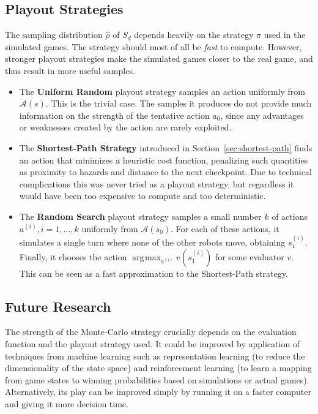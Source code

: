 \documentclass{article}
\newcommand{\action}{a}
\newcommand{\actions}{\mathcal{A}}
\newcommand{\randomState}{S}
\newcommand{\state}{s}
\newcommand{\depth}{d}
\newcommand{\evaluator}{v}
\newcommand{\probability}{\rho}
\DeclareMathOperator*{\argmax}{\arg\!\max}
\newcommand{\initial}{0}
\begin{document}
\subsection{Playout Strategies} \label{sec:playout-strategies}

The sampling distribution $\hat{\probability}$ of $\randomState_\depth$ depends heavily on the strategy $\pi$ used in the simulated games.  The strategy should most of all be \emph{fast} to compute.  However, stronger playout strategies make the simulated games closer to the real game, and thus result in more useful samples.

\begin{itemize}
\item The \textbf{Uniform Random} playout strategy samples an action uniformly from $\actions(\state)$.  This is the trivial case.  The samples it produces do not provide much information on the strength of the tentative action $\action_\initial$, since any advantages or weaknesses created by the action are rarely exploited.  \\
\item The \textbf{Shortest-Path Strategy} introduced in Section~\ref{sec:shortest-path} finds an action that minimizes a heuristic cost function, penalizing such quantities as proximity to hazards and distance to the next checkpoint.  Due to technical complications this was never tried as a playout strategy, but regardless it would have been too expensive to compute and too deterministic. \\
\item The \textbf{Random Search} playout strategy samples a small number $k$ of actions $\action^{(i)}, i = 1,\ldots,k$ uniformly from $\actions(\state_0)$.  For each of these actions, it simulates a single turn where none of the other robots move, obtaining $\state_1^{(i)}$.  Finally, it chooses the action $\argmax_{\action^{(i)}} \evaluator(\state_1^{(i)})$ for some evaluator $\evaluator$.  This can be seen as a fast approximation to the Shortest-Path strategy. \\
\end{itemize}


\subsection{Future Research}

The strength of the Monte-Carlo strategy crucially depends on the evaluation function and the playout strategy used.  It could be improved by application of techniques from machine learning such as representation learning \cite{bengio2013representation} (to reduce the dimensionality of the state space) and reinforcement learning \cite{sutton1998reinforcement} (to learn a mapping from game states to winning probabilities based on simulations or actual games).  Alternatively, its play can be improved simply by running it on a faster computer and giving it more decision time.
\end{document}
